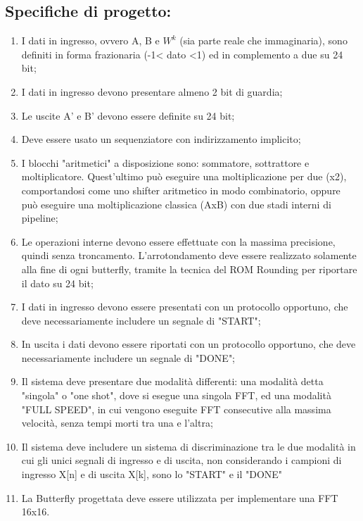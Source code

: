 \documentclass[a4paper, titlepage]{article}
\begin{document}
\subsection{Specifiche di progetto:}

\begin{enumerate} %
    \item I dati in ingresso, ovvero A, B e $W^k$ (sia parte reale che immaginaria), sono definiti in forma frazionaria (-1< dato <1) ed in complemento a due su 24 bit;
    \item I dati in ingresso devono presentare almeno 2 bit di guardia;
    \item Le uscite A' e B' devono essere definite su 24 bit;
    \item Deve essere usato un sequenziatore con indirizzamento implicito;
    \item I blocchi "aritmetici" a disposizione sono: sommatore, sottrattore e moltiplicatore. Quest'ultimo può eseguire una moltiplicazione per due (x2), comportandosi come uno shifter aritmetico in modo combinatorio, oppure può eseguire una moltiplicazione classica (AxB) con due stadi interni di pipeline;
    \item Le operazioni interne devono essere effettuate con la massima precisione, quindi senza troncamento. L'arrotondamento deve essere realizzato solamente alla fine di ogni butterfly, tramite la tecnica del ROM Rounding per riportare il dato su 24 bit;
    \item I dati in ingresso devono essere presentati con un protocollo opportuno, che deve necessariamente includere un segnale di "START";
    \item In uscita i dati devono essere riportati con un protocollo opportuno, che deve necessariamente includere un segnale di "DONE";
    \item Il sistema deve presentare due modalità differenti: una modalità detta "singola" o "one shot", dove si esegue una singola FFT, ed una modalità "FULL SPEED", in cui vengono eseguite FFT consecutive alla massima velocità, senza tempi morti tra una e l'altra;
    \item Il sistema deve includere un sistema di discriminazione tra le due modalità in cui gli unici segnali di ingresso e di uscita, non considerando i campioni di ingresso X[n] e di uscita X[k], sono lo "START" e il "DONE"
    \item La Butterfly progettata deve essere utilizzata per implementare una FFT 16x16.
\end{enumerate}
\end{document}
